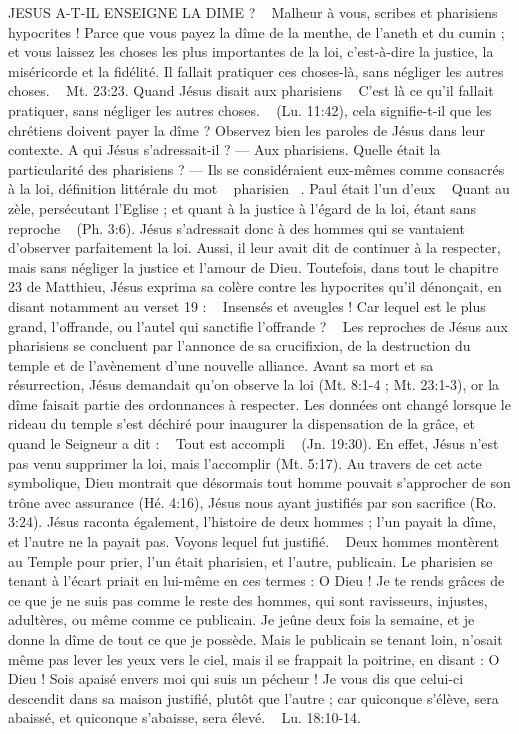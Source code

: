 \begin{multicols}{2}
{JESUS A-T-IL ENSEIGNE LA DIME ?
~ Malheur à vous, scribes et pharisiens hypocrites ! Parce que vous payez la dîme de la menthe, de l'aneth et du cumin ; et vous laissez les choses les plus importantes de la loi, c'est-à-dire la justice, la miséricorde et la fidélité. Il fallait pratiquer ces choses-là, sans négliger les autres choses. ~ Mt. 23:23.
Quand Jésus disait aux pharisiens ~ C’est là ce qu’il fallait pratiquer, sans négliger les autres choses. ~ (Lu. 11:42), cela signifie-t-il que les chrétiens doivent payer la dîme ? 
Observez bien les paroles de Jésus dans leur contexte. 
A qui Jésus s’adressait-il ? — Aux pharisiens. Quelle était la particularité des pharisiens ? — Ils se considéraient eux-mêmes comme consacrés à la loi, définition littérale du mot ~ pharisien ~. Paul était l'un d'eux ~ Quant au zèle, persécutant l'Eglise ; et quant à la justice à l’égard de la loi, étant sans reproche ~ (Ph. 3:6). Jésus s’adressait donc à des hommes qui se vantaient d’observer parfaitement la loi. Aussi, il leur avait dit de continuer à la respecter, mais sans négliger la justice et l’amour de Dieu. Toutefois, dans tout le chapitre 23 de Matthieu, Jésus exprima sa colère contre les hypocrites qu’il dénonçait, en disant notamment au verset 19 : ~ Insensés et aveugles ! Car lequel est le plus grand, l’offrande, ou l'autel qui sanctifie l’offrande ? ~ Les reproches de Jésus aux pharisiens se concluent par l’annonce de sa crucifixion, de la destruction du temple et de l’avènement d’une nouvelle alliance. Avant sa mort et sa résurrection, Jésus demandait qu’on observe la loi (Mt. 8:1-4 ; Mt. 23:1-3), or la dîme faisait partie des ordonnances à respecter. Les données ont changé lorsque le rideau du temple s'est déchiré pour inaugurer la dispensation de la grâce, et quand le Seigneur a dit : ~ Tout est accompli ~ (Jn. 19:30). En effet, Jésus n'est pas venu supprimer la loi, mais l'accomplir (Mt. 5:17). Au travers de cet acte symbolique, Dieu montrait que désormais tout homme pouvait s'approcher de son trône avec assurance (Hé. 4:16), Jésus nous ayant justifiés par son sacrifice (Ro. 3:24). Jésus raconta également, l’histoire de deux hommes ; l’un payait la dîme, et l’autre ne la payait pas. Voyons lequel fut justifié. ~ Deux hommes montèrent au Temple pour prier, l'un était pharisien, et l'autre, publicain. Le pharisien se tenant à l'écart priait en lui-même en ces termes : O Dieu ! Je te rends grâces de ce que je ne suis pas comme le reste des hommes, qui sont ravisseurs, injustes, adultères, ou même comme ce publicain. Je jeûne deux fois la semaine, et je donne la dîme de tout ce que je possède. Mais le publicain se tenant loin, n'osait même pas lever les yeux vers le ciel, mais il se frappait la poitrine, en disant : O Dieu ! Sois apaisé envers moi qui suis un pécheur ! Je vous dis que celui-ci descendit dans sa maison justifié, plutôt que l'autre ; car quiconque s'élève, sera abaissé, et quiconque s'abaisse, sera élevé. ~ Lu. 18:10-14.
}
\end{multicols}

